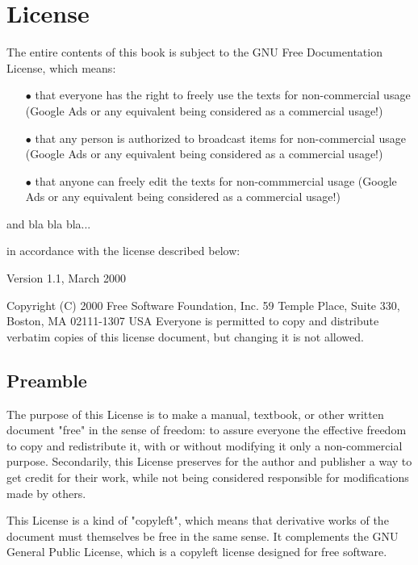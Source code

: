 	\newpage
	\thispagestyle{empty}
	\mbox{}
	\section{License}
	The entire contents of this book is subject to the GNU Free Documentation License, which means:
	\begin{itemize}
			\item[$\bullet$] that everyone has the right to freely use the texts for non-commercial usage (Google Ads or any equivalent being considered as a commercial usage!)
			\item[$\bullet$] that any person is authorized to broadcast items for non-commercial usage (Google Ads or any equivalent being considered as a commercial usage!)
			\item[$\bullet$] that anyone can freely edit the texts for non-commmercial usage (Google Ads or any equivalent being considered as a commercial usage!)
	\end{itemize}
	
	and bla bla bla...

	in accordance with the license described below: 

	\begin{center}
	Version 1.1, March 2000
		
	Copyright (C) 2000 Free Software Foundation, Inc. 59 Temple Place, Suite 330, Boston, MA 02111-1307 USA Everyone is permitted to copy and distribute verbatim copies of this license document, but changing it is not allowed. 
	\end{center}

	\subsection{Preamble} 

	The purpose of this License is to make a manual, textbook, or other written document "free" in the sense of freedom: to assure everyone the effective freedom to copy and redistribute it, with or without modifying it only a non-commercial purpose. Secondarily, this License preserves for the author and publisher a way to get credit for their work, while not being considered responsible for modifications made by others.

	This License is a kind of "copyleft", which means that derivative works of the document must themselves be free in the same sense. It complements the GNU General Public License, which is a copyleft license designed for free software. 

